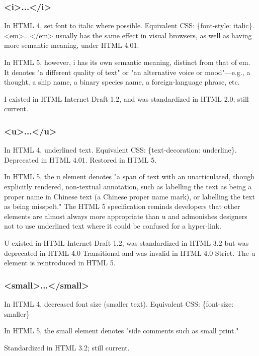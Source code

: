 \subsubsection{<i>...</i>}

In HTML 4, set font to italic where possible. Equivalent CSS: \{font-style: italic\}. <em>...</em> usually has the same effect in visual browsers, as well as having more semantic meaning, under HTML 4.01.

In HTML 5, however, i has its own semantic meaning, distinct from that of em. It denotes "a different quality of text" or "an alternative voice or mood"—e.g., a thought, a ship name, a binary species name, a foreign-language phrase, etc.

I existed in HTML Internet Draft 1.2, and was standardized in HTML 2.0; still current.


\subsubsection{<u>...</u>}

In HTML 4, underlined text. Equivalent CSS: \{text-decoration: underline\}. Deprecated in HTML 4.01. Restored in HTML 5.



In HTML 5, the u element denotes "a span of text with an unarticulated, though explicitly rendered, non-textual annotation, such as labelling the text as being a proper name in Chinese text (a Chinese proper name mark), or labelling the text as being misspelt." The HTML 5 specification reminds developers that other elements are almost always more appropriate than u and admonishes designers not to use underlined text where it could be confused for a hyper-link.

U existed in HTML Internet Draft 1.2, was standardized in HTML 3.2 but was deprecated in HTML 4.0 Transitional and was invalid in HTML 4.0 Strict. The u element is reintroduced in HTML 5.


\subsubsection{<small>...</small>}

In HTML 4, decreased font size (smaller text). Equivalent CSS: \{font-size: smaller\}

In HTML 5, the small element denotes "side comments such as small print."

Standardized in HTML 3.2; still current.

